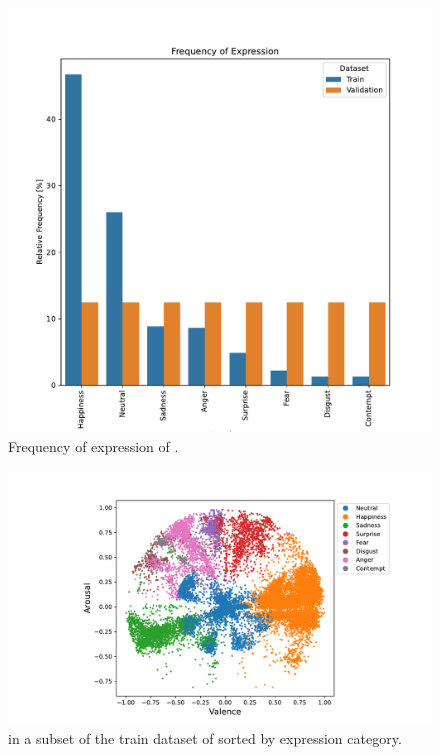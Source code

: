 \begin{figure}[t]
    \centering
    \includegraphics[width=\columnwidth]{pictures/affectnet/frequency_of_expression.pdf}
    \caption{Frequency of expression of \affectnet{}.}
    \label{frequence\affectnet{}}
\end{figure}

\begin{figure}[t]
    \centering
    \includegraphics[width=\columnwidth, trim={4cm 0 2.5cm 0}, clip]{pictures/affectnet/scatterplot.pdf}
    \caption{\VA{} in a subset of the train dataset of \affectnet{} sorted by expression category.}
    \label{fig:scatterplot}
\end{figure}

